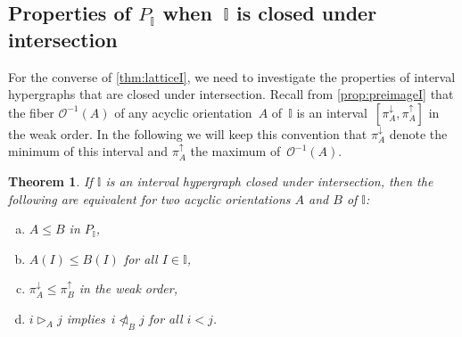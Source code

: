 \documentclass[reqno]{amsart}
\newtheorem{theorem}{Theorem}[section]
\theoremstyle{definition}
\newcommand{\less}{\vartriangleleft} %
\newcommand{\more}{\vartriangleright} %
\newcommand{\projDown}{\pi^\downarrow} %
\newcommand{\projUp}{\pi^\uparrow} %
\newcommand{\Or}{\mathcal O}  %
\newcommand{\II}{\mathbb I} %
\begin{document}

\subsection{Properties of $P_\II$ when~$\II$ is closed under intersection}  
\label{subsec:IntClosedI}

For the converse of \cref{thm:latticeI}, we need to investigate the properties of interval hypergraphs that are closed under intersection.
Recall from \cref{prop:preimageI} that the fiber $\Or^{-1}(A)$ of any acyclic orientation~$A$ of~$\II$ is an interval~$[\projDown_A,\projUp_A]$ in the weak order.
In the following we will keep this convention that $\projDown_A$ denote the minimum of this interval and $\projUp_A$ the maximum of~$\Or^{-1}(A)$.

\begin{theorem}
\label{thm:propertiesI}
If $\II$ is an interval  hypergraph closed under intersection, then the following are equivalent for two acyclic orientations $A$ and $B$ of $\II$:
\begin{enumerate}[(a)]
	\item $A\le B$ in $P_\II$,
	\item $A(I) \le B(I)$ for all $I\in\II$,
	\item $\projDown_A \le \projUp_B$ in the weak order,
	\item $i \more_A j$ implies~$i \not\less_B j$ for all $i<j$.
\end{enumerate}
\end{theorem}
\end{document}
